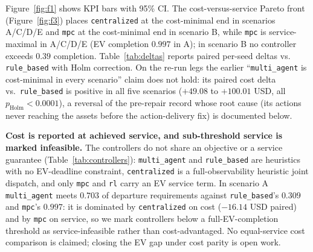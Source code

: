 \documentclass[11pt,a4paper]{article}
\newcommand{\agent}[1]{\texttt{#1}}
\begin{document}
Figure~\ref{fig:f1} shows KPI bars with 95\% CI. The cost-versus-service Pareto front (Figure~\ref{fig:f3}) places \agent{centralized} at the cost-minimal end in scenarios A/C/D/E and \agent{mpc} at the cost-minimal end in scenario B, while \agent{mpc} is service-maximal in A/C/D/E (EV completion $0.997$ in A); in scenario B no controller exceeds $0.39$ completion. Table~\ref{tab:deltas} reports paired per-seed deltas vs. \agent{rule\_based} with Holm correction. On the re-run legs the earlier ``\agent{multi\_agent} is cost-minimal in every scenario'' claim does not hold: its paired cost delta vs.\ \agent{rule\_based} is positive in all five scenarios ($+49.08$ to $+100.01$ USD, all $p_{\mathrm{Holm}} < 0.0001$), a reversal of the pre-repair record whose root cause (its actions never reaching the assets before the action-delivery fix) is documented below.

\textbf{Cost is reported at achieved service, and sub-threshold service is
marked infeasible.} The controllers do not share an objective or a service
guarantee (Table~\ref{tab:controllers}): \agent{multi\_agent} and
\agent{rule\_based} are heuristics with no EV-deadline constraint,
\agent{centralized} is a full-observability heuristic joint dispatch, and only
\agent{mpc} and \agent{rl} carry an EV service term. In scenario A
\agent{multi\_agent} meets $0.703$ of departure requirements against
\agent{rule\_based}'s $0.309$ and \agent{mpc}'s $0.997$: it is dominated by
\agent{centralized} on cost ($-16.14$ USD paired) and by \agent{mpc} on
service, so we mark controllers below a full-EV-completion threshold as
service-infeasible rather than cost-advantaged. No equal-service cost
comparison is claimed; closing the EV gap under cost parity is open work.
\end{document}
